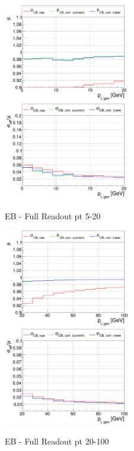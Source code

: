 \begin{figure}
\includegraphics[width=0.495\textwidth]{./ECAL_plots/plotsPU/EB/FULL/pdf/GENPT/EBFULL_GENPT_0005_0020_MuOverBins.pdf}
\includegraphics[width=0.495\textwidth]{./ECAL_plots/plotsPU/EB/FULL/pdf/GENPT/EBFULL_GENPT_0005_0020_EffSigmaOverBins.pdf}
\caption{EB - Full Readout pt 5-20}
\end{figure}

\begin{figure}
\includegraphics[width=0.495\textwidth]{./ECAL_plots/plotsPU/EB/FULL/pdf/GENPT/EBFULL_GENPT_0020_0100_MuOverBins.pdf}
\includegraphics[width=0.495\textwidth]{./ECAL_plots/plotsPU/EB/FULL/pdf/GENPT/EBFULL_GENPT_0020_0100_EffSigmaOverBins.pdf}
\caption{EB - Full Readout pt 20-100}
\end{figure}

